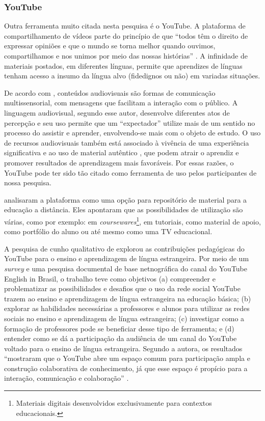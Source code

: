\documentclass[portuguese]{textolivre}
\begin{document}
\subsubsection{YouTube}\label{sec-resumo}
Outra ferramenta muito citada nesta pesquisa é o YouTube. A plataforma de compartilhamento de vídeos parte do princípio de que “todos têm o direito de expressar opiniões e que o mundo se torna melhor quando ouvimos, compartilhamos e nos unimos por meio das nossas histórias” \cite{youtube_about_nodate}. A infinidade de materiais postados, em diferentes línguas, permite que aprendizes de línguas tenham acesso a insumo da língua alvo (fidedignos ou não) em variadas situações.

De acordo com \textcite{moran_ensino_2013}, conteúdos audiovisuais são formas de comunicação multissensorial, com mensagens que facilitam a interação com o público. A linguagem audiovisual, segundo esse autor, desenvolve diferentes atos de percepção e seu uso permite que um “expectador” utilize mais de um sentido no processo do assistir e aprender, envolvendo-se mais com o objeto de estudo. O uso de recursos audiovisuais também está associado à vivência de uma experiência significativa e ao uso de material autêntico \cite{geddes_video_1982,mcgill_ten_2010}, que podem atrair o aprendiz e promover resultados de aprendizagem mais favoráveis. Por essas razões, o YouTube pode ter sido tão citado como ferramenta de uso pelos participantes de nossa pesquisa.

\textcite{caetano_you_2007} analisaram a plataforma como uma opção para repositório de material para a educação a distância. Eles apontaram que as possibilidades de utilização são várias, como por exemplo: em \textit{coursewares}\footnote{Materiais digitais desenvolvidos exclusivamente para contextos educacionais.}, em tutoriais, como material de apoio, como portfólio do aluno ou até mesmo como uma TV educacional.

A pesquisa de cunho qualitativo de \textcite{silva_contribuicoes_2018} explorou as contribuições pedagógicas do YouTube para o ensino e aprendizagem de língua estrangeira. Por meio de um \textit{survey} e uma pesquisa documental de base netnográfica do canal do YouTube English in Brasil, o trabalho teve como objetivos (a) compreender e problematizar as possibilidades e desafios que o uso da rede social YouTube trazem ao ensino e aprendizagem de língua estrangeira na educação básica; (b) explorar as habilidades necessárias a professores e alunos para utilizar as redes sociais no ensino e aprendizagem de língua estrangeira; (c) investigar como a formação de professores pode se beneficiar desse tipo de ferramenta; e (d) entender como se dá a participação da audiência de um canal do YouTube voltado para o ensino de língua estrangeira. Segundo a autora, os resultados “mostraram que o YouTube abre um espaço comum para participação ampla e construção colaborativa de conhecimento, já que esse espaço é propício para a interação, comunicação e colaboração” \cite[p. 146]{silva_contribuicoes_2018}. 
\end{document}
